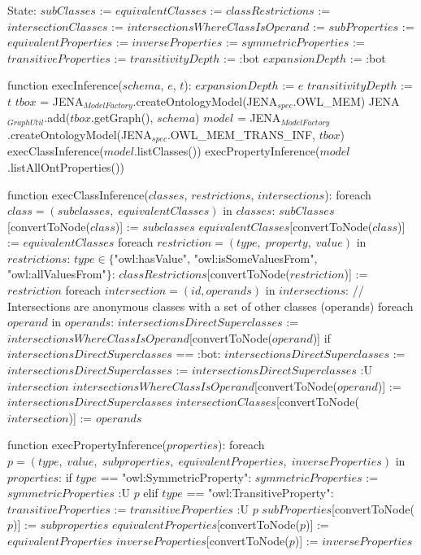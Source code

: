 State:
    $subClasses$ := {}
    $equivalentClasses$ := {}
    $classRestrictions$ := {}
    $intersectionClasses$ := {}
    $intersectionsWhereClassIsOperand$ := {}
    $subProperties$ := {}
    $equivalentProperties$ := {}
    $inverseProperties$ := {}
    $symmetricProperties$ := {}
    $transitiveProperties$ := {}
    $transitivityDepth$ := :bot
    $expansionDepth$ := :bot

function execInference($schema$, $e$, $t$):
    $expansionDepth$ := $e$
    $transitivityDepth$ := $t$
    $tbox$ = JENA$_{ModelFactory}$.createOntologyModel(JENA$_{spec}$.OWL_MEM)
    JENA$_{GraphUtil}$.add($tbox$.getGraph(), $schema$)
    $model$ = JENA$_{ModelFactory}$.createOntologyModel(JENA$_{spec}$.OWL_MEM_TRANS_INF, $tbox$)
    execClassInference($model$.listClasses())
    execPropertyInference($model$.listAllOntProperties())

function execClassInference($classes$, $restrictions$, $intersections$):
    foreach $class = (subclasses, \; equivalentClasses)$ in $classes$:
        $subClasses$[convertToNode($class$)] := $subclasses$
        $equivalentClasses$[convertToNode($class$)] := $equivalentClasses$
    foreach $restriction = (type, \; property, \; value)$ in $restrictions$:
        $type \in \{$"owl:hasValue", "owl:isSomeValuesFrom", "owl:allValuesFrom"$\}$:
            $classRestrictions$[convertToNode($restriction$)] := $restriction$
    foreach $intersection = (id, operands)$ in $intersections$: // Intersections are anonymous classes with a set of other classes (operands)
        foreach $operand$ in $operands$:
            $intersectionsDirectSuperclasses$ := $intersectionsWhereClassIsOperand$[convertToNode($operand$)]
            if $intersectionsDirectSuperclasses$ == :bot:
                $intersectionsDirectSuperclasses$ := {}
            $intersectionsDirectSuperclasses$ := $intersectionsDirectSuperclasses$ :U $intersection$
            $intersectionsWhereClassIsOperand$[convertToNode($operand$)] := $intersectionsDirectSuperclasses$
        $intersectionClasses$[convertToNode($intersection$)] := $operands$

function execPropertyInference($properties$):
    foreach $p = (type, \; value, \; subproperties, \; equivalentProperties, \; inverseProperties)$ in $properties$:
        if $type$ == "owl:SymmetricProperty":
            $symmetricProperties$ := $symmetricProperties$ :U { $p$ }
        elif $type$ == "owl:TransitiveProperty":
            $transitiveProperties$ := $transitiveProperties$ :U { $p$ }
        $subProperties$[convertToNode($p$)] := $subproperties$
        $equivalentProperties$[convertToNode($p$)] := $equivalentProperties$
        $inverseProperties$[convertToNode($p$)] := $inverseProperties$
    
